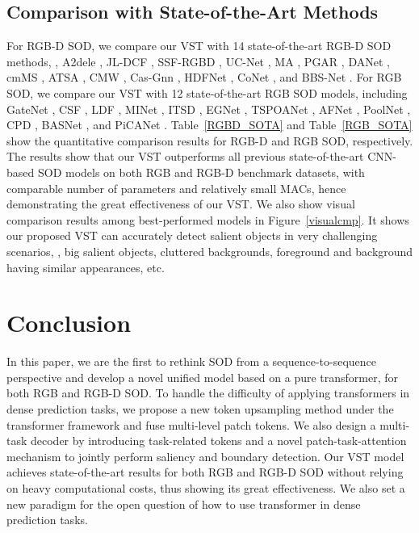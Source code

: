 \documentclass[10pt,twocolumn,letterpaper]{article}
\begin{document}
\subsection{Comparison with State-of-the-Art Methods}
For RGB-D SOD, we compare our VST with 14 state-of-the-art RGB-D SOD methods, \ie, A2dele \cite{piao2020a2dele}, JL-DCF \cite{Fu2020JLDCF}, SSF-RGBD \cite{zhang2020select}, UC-Net \cite{zhang2020ucnet}, MA \cite{liu2020S2MA}, PGAR \cite{chen2020PGAR}, DANet \cite{zhao2020DANet}, cmMS \cite{li2020cmMS}, ATSA \cite{zhang2020ATSA}, CMW \cite{Li2020CMWNet}, Cas-Gnn \cite{luo2020Cas-Gnn}, HDFNet \cite{HDFNet-ECCV2020}, CoNet \cite{Wei2020CoNet}, and BBS-Net \cite{fan2020bbsnet}.
For RGB SOD, we compare our VST with 12 state-of-the-art RGB SOD models, including GateNet \cite{GateNet}, CSF \cite{gao2020sod100k}, LDF \cite{CVPR2020_LDF}, MINet \cite{MINet-CVPR2020}, ITSD \cite{Zhou2020ITSD}, EGNet \cite{zhao2019EGNet}, TSPOANet \cite{Liu_TSPOANet}, AFNet \cite{Feng_AFNet}, PoolNet \cite{Liu19PoolNet}, CPD \cite{Wu_CPD}, BASNet \cite{Qin19BASNet}, and PiCANet \cite{liu2018picanet}. 
Table~\ref{RGBD_SOTA} and Table~\ref{RGB_SOTA} show the quantitative comparison results for RGB-D and RGB SOD, respectively.
The results show that our VST outperforms all previous state-of-the-art CNN-based SOD models on both RGB and RGB-D benchmark datasets, with comparable number of parameters and relatively small MACs, hence demonstrating the great effectiveness of our VST.
We also show visual comparison results among best-performed models in Figure~\ref{visualcmp}. It shows our proposed VST can accurately detect salient objects in very challenging scenarios, \eg, big salient objects, cluttered backgrounds, foreground and background having similar appearances, etc.

\section{Conclusion}
In this paper, we are the first to rethink SOD from a sequence-to-sequence perspective and develop a novel unified model based on a pure transformer, for both RGB and RGB-D SOD. To handle the difficulty of applying transformers in dense prediction tasks, we propose a new token upsampling method under the transformer framework and fuse multi-level patch tokens. We also design a multi-task decoder by introducing task-related tokens and a novel patch-task-attention mechanism to jointly perform saliency and boundary detection. Our VST model achieves state-of-the-art results for both RGB and RGB-D SOD without relying on heavy computational costs, thus showing its great effectiveness. We also set a new paradigm for the open question of how to use transformer in dense prediction tasks. 
\end{document}

